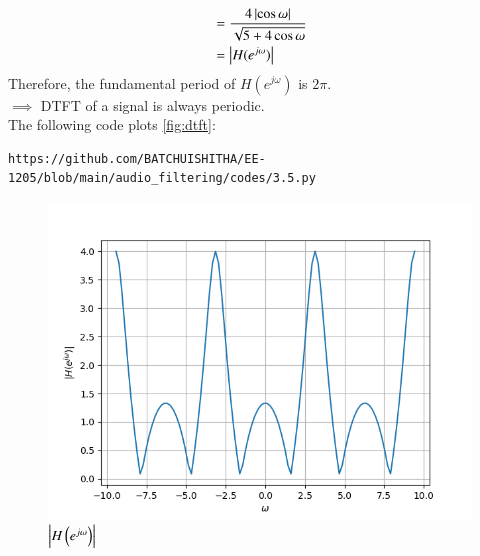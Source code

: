 \documentclass[journal,12pt,twocolumn]{IEEEtran}
\theoremstyle{remark}
\begin{document}
\begin{enumerate}[label=\thesection.\arabic*]
\begin{align}
&= \frac{4\left\vert\cos\omega\right\vert}{\sqrt{5+4\cos\omega}} \\
&= \left\vert H(e^{j\omega})\right\vert 
\end{align}
Therefore, the fundamental period of $H(e^{j\omega})$ is $2\pi$.\\
$\implies$ DTFT of a signal is always periodic.\\ 
The following code plots \eqref{fig:dtft}:
\begin{lstlisting}
https://github.com/BATCHUISHITHA/EE-1205/blob/main/audio_filtering/codes/3.5.py
\end{lstlisting}
\begin{figure}[ht]
	\centering
	\includegraphics[width=\columnwidth]{figs/3.4.png}
	\caption{$\left\vert H\left(e^{j\omega}\right)\right\vert$}
	\label{fig:dtft}
\end{figure}
\end{enumerate}
\end{document}
